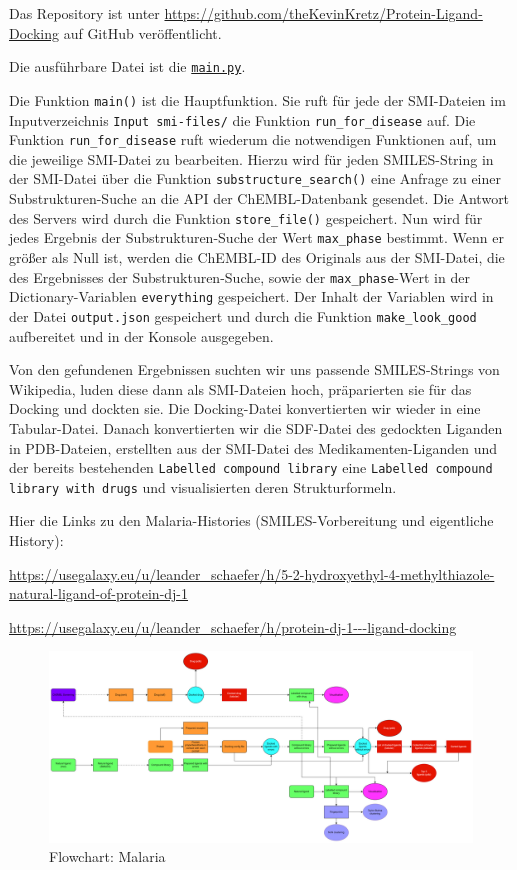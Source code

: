 \documentclass[10pt]{article}
\begin{document}
    Das Repository ist unter \url{https://github.com/theKevinKretz/Protein-Ligand-Docking} auf
    GitHub veröffentlicht.

    Die ausführbare Datei ist
    die \href{https://github.com/theKevinKretz/Protein-Ligand-Docking/blob/master/main.py}{\texttt{main.py}}.

    Die Funktion \texttt{main()} ist die Hauptfunktion.
    Sie ruft für jede der SMI-Dateien im Inputverzeichnis \texttt{Input smi-files/} die Funktion
    \texttt{run\_for\_disease} auf.
    Die Funktion \texttt{run\_for\_disease} ruft wiederum die notwendigen Funktionen auf, um die jeweilige SMI-Datei
    zu bearbeiten.
    Hierzu wird für jeden SMILES-String in der SMI-Datei über die Funktion \texttt{substructure\_search()} eine
    Anfrage zu einer Substrukturen-Suche an die API der ChEMBL-Datenbank gesendet.
    Die Antwort des Servers wird durch die Funktion \texttt{store\_file()} gespeichert.
    Nun wird für jedes Ergebnis der Substrukturen-Suche der Wert \texttt{max\_phase} bestimmt.
    Wenn er größer als Null ist, werden die ChEMBL-ID des Originals aus der SMI-Datei, die des Ergebnisses der
    Substrukturen-Suche, sowie der \texttt{max\_phase}-Wert in der Dictionary-Variablen \texttt{everything} gespeichert.
    Der Inhalt der Variablen wird in der Datei \texttt{output.json} gespeichert und durch die Funktion
    \texttt{make\_look\_good} aufbereitet und in der Konsole ausgegeben.

    Von den gefundenen Ergebnissen suchten wir uns passende SMILES-Strings von Wikipedia, luden diese dann als
    SMI-Dateien hoch, präparierten sie für das Docking und dockten sie. Die Docking-Datei konvertierten wir wieder in
    eine Tabular-Datei. Danach konvertierten wir die SDF-Datei des gedockten Liganden in PDB-Dateien, erstellten aus
    der SMI-Datei des Medikamenten-Liganden und der bereits bestehenden \texttt{Labelled compound library} eine
    \texttt{Labelled compound library with drugs} und visualisierten deren Strukturformeln.

    Hier die Links zu den Malaria-Histories (SMILES-Vorbereitung und eigentliche History):

    \url{https://usegalaxy.eu/u/leander_schaefer/h/5-2-hydroxyethyl-4-methylthiazole-natural-ligand-of-protein-dj-1}

    \url{https://usegalaxy.eu/u/leander_schaefer/h/protein-dj-1---ligand-docking}


    \begin{figure}[h]
        \centering
        \includegraphics[width=0.7\linewidth]{malaria-flowchart}
        \caption{Flowchart: Malaria}
    \end{figure}
\end{document}
